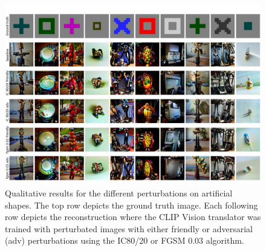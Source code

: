 \begin{figure}[H]
   \centering
   \includegraphics[width=1\textwidth]{plots/advpert_qual_art.JPEG}
   \caption[Experiment 3: Reconstructed images on artificial shapes for different perturbations]{Qualitative results for the different perturbations on artificial shapes. The top row depicts the ground truth image. Each following row depicts the reconstruction where the CLIP Vision translator was trained with perturbated images with either friendly or adversarial (adv) perturbations using the IC80/20 or FGSM 0.03 algorithm.}\label{fig:advpert_qual_art}
\end{figure}

